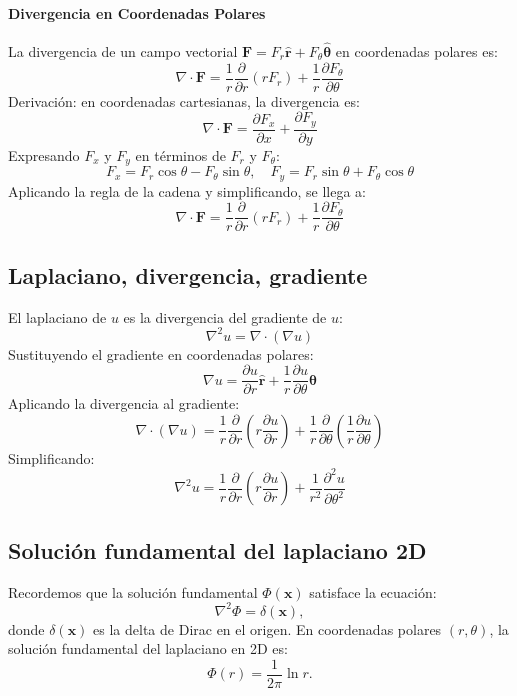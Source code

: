 \documentclass[11pt]{book}
\theoremstyle{definicion}
\theoremstyle{teorema}
\theoremstyle{ejemplo}
\begin{document}
\paragraph{Divergencia en Coordenadas Polares}

La divergencia de un campo vectorial \( \mathbf{F} = F_r \hat{\mathbf{r}} + F_\theta \hat{\boldsymbol{\theta}} \) en coordenadas polares es:
\[
\nabla \cdot \mathbf{F} = \frac{1}{r} \frac{\partial}{\partial r} (r F_r) + \frac{1}{r} \frac{\partial F_\theta}{\partial \theta}
\]
Derivación:
en coordenadas cartesianas, la divergencia es:
  \[
  \nabla \cdot \mathbf{F} = \frac{\partial F_x}{\partial x} + \frac{\partial F_y}{\partial y}
  \]
Expresando \( F_x \) y \( F_y \) en términos de \( F_r \) y \( F_\theta \):
  \[
  F_x = F_r \cos \theta - F_\theta \sin \theta, \quad F_y = F_r \sin \theta + F_\theta \cos \theta
  \]
Aplicando la regla de la cadena y simplificando, se llega a:
  \[
  \nabla \cdot \mathbf{F} = \frac{1}{r} \frac{\partial}{\partial r} (r F_r) + \frac{1}{r} \frac{\partial F_\theta}{\partial \theta}
  \]

\subsection{Laplaciano, divergencia, gradiente}

\noindent El laplaciano de \( u \) es la divergencia del gradiente de \( u \):
\[
\nabla^2 u = \nabla \cdot (\nabla u)
\]
Sustituyendo el gradiente en coordenadas polares:
\[
\nabla u = \frac{\partial u}{\partial r} \hat{\mathbf{r}} + \frac{1}{r} \frac{\partial u}{\partial \theta} \hat{\boldsymbol{\theta}}
\]
Aplicando la divergencia al gradiente:
\[
\nabla \cdot (\nabla u) = \frac{1}{r} \frac{\partial}{\partial r} \left( r \frac{\partial u}{\partial r} \right) + \frac{1}{r} \frac{\partial}{\partial \theta} \left( \frac{1}{r} \frac{\partial u}{\partial \theta} \right)
\]
Simplificando:
\[
\nabla^2 u = \frac{1}{r} \frac{\partial}{\partial r} \left( r \frac{\partial u}{\partial r} \right) + \frac{1}{r^2} \frac{\partial^2 u}{\partial \theta^2}
\]

\subsection{Soluci\'on fundamental del laplaciano 2D}

\noindent Recordemos que la solución fundamental \( \Phi(\mathbf{x}) \) satisface la ecuación:
\[
\nabla^2 \Phi = \delta(\mathbf{x}),
\]
donde \( \delta(\mathbf{x}) \) es la delta de Dirac en el origen. En coordenadas polares \((r, \theta)\), la solución fundamental del laplaciano en 2D es:
\[
\Phi(r) = \frac{1}{2\pi} \ln r.
\]
\end{document}
